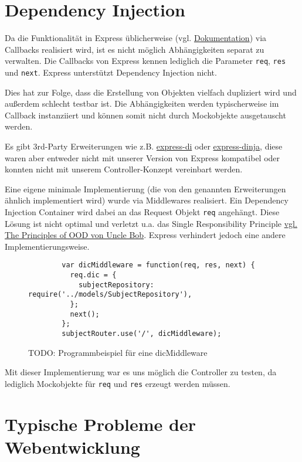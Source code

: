 \section{Dependency Injection}\label{dependency-injection}

Da die Funktionalität in Express üblicherweise (vgl.
\href{http://expressjs.com/en/starter/basic-routing.html}{Dokumentation})
via Callbacks realisiert wird, ist es nicht möglich Abhängigkeiten
separat zu verwalten. Die Callbacks von Express kennen lediglich die
Parameter \texttt{req}, \texttt{res} und \texttt{next}. Express
unterstützt Dependency Injection nicht.

Dies hat zur Folge, dass die Erstellung von Objekten vielfach dupliziert
wird und außerdem schlecht testbar ist. Die Abhängigkeiten werden
typischerweise im Callback instanziiert und können somit nicht durch
Mockobjekte ausgetauscht werden.

Es gibt 3rd-Party Erweiterungen wie z.B.
\href{https://github.com/luin/express-di}{express-di} oder
\href{https://github.com/floatdrop/express-dinja}{express-dinja}, diese
waren aber entweder nicht mit unserer Version von Express kompatibel
oder konnten nicht mit unserem Controller-Konzept vereinbart werden.

Eine eigene minimale Implementierung (die von den genannten
Erweiterungen ähnlich implementiert wird) wurde via Middlewares
realisiert. Ein Dependency Injection Container wird dabei an das Request
Objekt \texttt{req} angehängt. Diese Lösung ist nicht optimal und
verletzt u.a. das Single Responsibility Principle
\href{http://www.butunclebob.com/ArticleS.UncleBob.PrinciplesOfOod}{vgl.
The Principles of OOD von Uncle Bob}. Express verhindert jedoch eine
andere Implementierungsweise.

\begin{figure}[t]
	\centering
	\begin{lstlisting}
		var dicMiddleware = function(req, res, next) {
		  req.dic = {
		    subjectRepository: require('../models/SubjectRepository'),
		  };
		  next();
		};
		subjectRouter.use('/', dicMiddleware);
	\end{lstlisting}
	\caption[dicMiddleware]{TODO: Programmbeispiel für eine dicMiddleware}
	\label{f:dicMiddleware}
\end{figure}

Mit dieser Implementierung war es uns möglich die Controller zu testen,
da lediglich Mockobjekte für \texttt{req} und \texttt{res} erzeugt
werden müssen.

\section{Typische Probleme der
Webentwicklung}\label{typische-probleme-der-webentwicklung}

